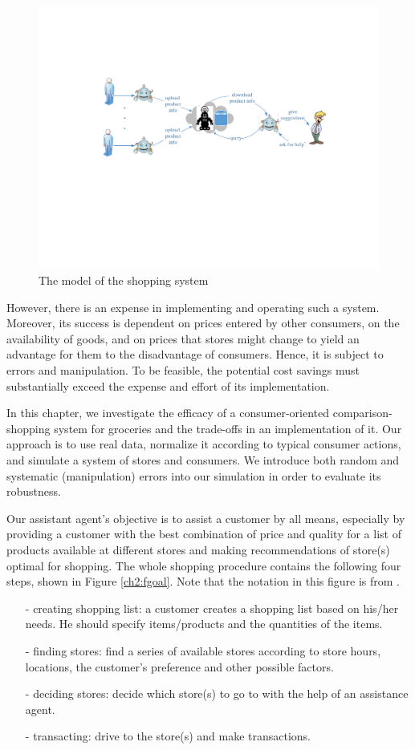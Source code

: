 \begin{figure}
\centering
\includegraphics[scale=0.8]{chap2/chap2-model.pdf}
\caption{The model of the shopping system}
\label{ch2:fmodelgrocery}
\end{figure}

However, there is an expense in implementing and operating such a system. Moreover, its success is dependent on prices entered by other consumers, on the availability of goods, and on prices that stores might change to yield an advantage for them to the disadvantage of consumers. Hence, it is subject to errors and manipulation. To be feasible, the potential cost savings must substantially exceed the expense and effort of its implementation.

In this chapter, we investigate the efficacy of a consumer-oriented comparison-shopping system for groceries and the trade-offs in an implementation of it. Our approach is to use real data, normalize it according to typical consumer actions, and simulate a system of stores and consumers. We introduce both random and systematic (manipulation) errors into our simulation in order to evaluate its robustness.

Our assistant agent's objective is to assist a customer by all means, especially by providing a customer with the best combination of price and quality for a list of products available at different stores and making recommendations of store(s) optimal for shopping. The whole shopping procedure contains the following four steps, shown in Figure \ref{ch2:fgoal}. Note that the notation in this figure is from \cite{sterling2009}.
\begin{itemize}
\item[-]creating shopping list: a customer creates a shopping list based on his/her needs. He should specify items/products and the quantities of the items. 
\item[-]finding stores: find a series of available stores according to store hours, locations, the customer's preference and other possible factors.
\item[-]deciding stores: decide which store(s) to go to with the help of an assistance agent.
\item[-]transacting: drive to the store(s) and make transactions.
\end{itemize}

